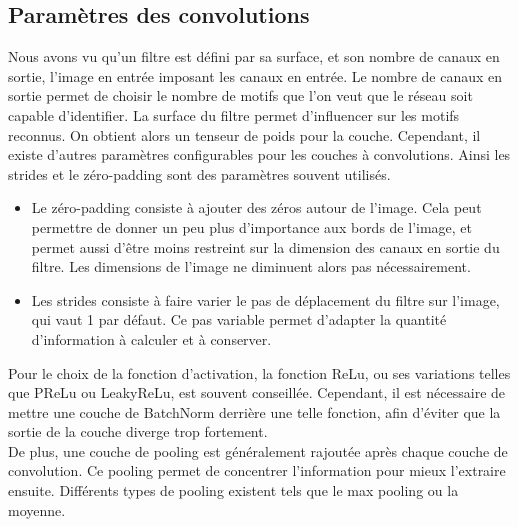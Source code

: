 \subsection{Paramètres des convolutions}
Nous avons vu qu'un filtre est défini par sa surface, et son nombre de canaux en sortie, l'image en entrée imposant les canaux en entrée.
Le nombre de canaux en sortie permet de choisir le nombre de motifs que l'on veut que le réseau soit capable d'identifier.
La surface du filtre permet d'influencer sur les motifs reconnus.
On obtient alors un tenseur de poids pour la couche.
Cependant, il existe d'autres paramètres configurables pour les couches à convolutions.
Ainsi les strides et le zéro-padding sont des paramètres souvent utilisés.
\begin{itemize}
	\item Le zéro-padding consiste à ajouter des zéros autour de l'image.
	Cela peut permettre de donner un peu plus d'importance aux bords de l'image, et permet aussi d'être moins restreint sur la dimension des canaux en sortie du filtre.
	Les dimensions de l'image ne diminuent alors pas nécessairement.

	\item Les strides consiste à faire varier le pas de déplacement du filtre sur l'image, qui vaut 1 par défaut.
	Ce pas variable permet d'adapter la quantité d'information à calculer et à conserver.
\end{itemize}
Pour le choix de la fonction d'activation, la fonction ReLu, ou ses variations telles que PReLu ou LeakyReLu, est souvent conseillée. Cependant, il est nécessaire de mettre une couche de BatchNorm derrière une telle fonction, afin d'éviter que la sortie de la couche diverge trop fortement.
\\
De plus, une couche de pooling est généralement rajoutée après chaque couche de convolution.
Ce pooling permet de concentrer l'information pour mieux l'extraire ensuite.
Différents types de pooling existent tels que le max pooling ou la moyenne.


